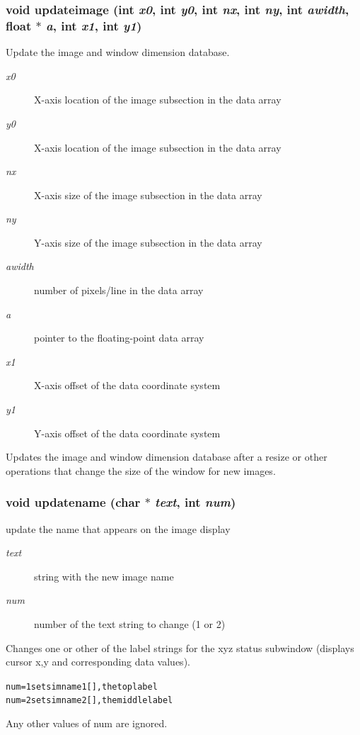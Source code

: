 \subsubsection{\setlength{\rightskip}{0pt plus 5cm}void updateimage (int {\em x0}, int {\em y0}, int {\em nx}, int {\em ny}, int {\em awidth}, float $\ast$ {\em a}, int {\em x1}, int {\em y1})}\label{xtv_8h_a83}


Update the image and window dimension database. 

\begin{Desc}
\item[Parameters:]
\begin{description}
\item[{\em x0}]X-axis location of the image subsection in the data array \item[{\em y0}]X-axis location of the image subsection in the data array \item[{\em nx}]X-axis size of the image subsection in the data array \item[{\em ny}]Y-axis size of the image subsection in the data array \item[{\em awidth}]number of pixels/line in the data array \item[{\em a}]pointer to the floating-point data array \item[{\em x1}]X-axis offset of the data coordinate system \item[{\em y1}]Y-axis offset of the data coordinate system\end{description}
\end{Desc}
Updates the image and window dimension database after a resize or other operations that change the size of the window for new images. 
\subsubsection{\setlength{\rightskip}{0pt plus 5cm}void updatename (char $\ast$ {\em text}, int {\em num})}\label{xtv_8h_a89}


update the name that appears on the image display 

\begin{Desc}
\item[Parameters:]
\begin{description}
\item[{\em text}]string with the new image name \item[{\em num}]number of the text string to change (1 or 2)\end{description}
\end{Desc}
Changes one or other of the label strings for the xyz status subwindow (displays cursor x,y and corresponding data values). \small\begin{alltt}
  num=1 sets imname1[], the top label
  num=2 sets imname2[], the middle label
  \end{alltt}\normalsize 
 Any other values of num are ignored.

